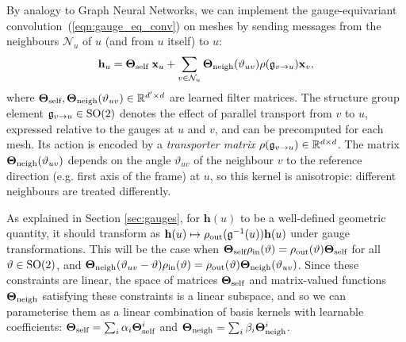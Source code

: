 By analogy to Graph Neural Networks, we can %
implement the gauge-equivariant convolution~(\ref{eqn:gauge_eq_conv}) on meshes by sending messages from the neighbours $\mathcal{N}_u$ of $u$ (and from $u$ itself) to $u$:
\begin{equation}
    \mathbf{h}_u = \boldsymbol{\Theta}_{\textup{self}} \; \mathbf{x}_u + \sum_{v \in \mathcal{N}_u} \boldsymbol{\Theta}_{\textup{neigh}}(\vartheta_{uv}) \rho({\mathfrak{g}}_{v \rightarrow u}) \mathbf{x}_v,
\end{equation}
where $\boldsymbol{\Theta}_{\textup{self}}, \boldsymbol{\Theta}_{\textup{neigh}}(\vartheta_{uv}) \in \mathbb{R}^{d' \times d}$ are learned filter matrices. %
The structure group element ${\mathfrak{g}}_{v \rightarrow u} \in \operatorname{SO}(2)$ denotes the effect of parallel transport from $v$ to $u$, expressed relative to the gauges at $u$ and $v$, and can be precomputed for each mesh. Its action is encoded by a \emph{transporter matrix} $\rho({\mathfrak{g}}_{v\rightarrow u})\in\mathbb{R}^{d\times d}$.
The matrix $\boldsymbol{\Theta}_{\textup{neigh}}(\vartheta_{uv})$ depends on the angle $\vartheta_{uv}$ of the neighbour $v$ to the reference direction (e.g. first axis of the frame) at $u$, so this kernel is anisotropic: different neighbours are treated differently.

As explained in Section \ref{sec:gauges}, 
for $\mathbf{h}(u)$ to be a well-defined geometric quantity, it should transform as $\mathbf{h}(u) \mapsto \rho_{\textup{out}}({\mathfrak{g}}^{-1}(u)) \mathbf{h}(u)$ under gauge transformations.
This will be the case when $\boldsymbol{\Theta}_{\textup{self}} \rho_{\textup{in}}(\vartheta) = \rho_{\textup{out}}(\vartheta) \boldsymbol{\Theta}_{\textup{self}}$ for all $\vartheta \in \operatorname{SO}(2)$, and $\boldsymbol{\Theta}_{\textup{neigh}}(\vartheta_{uv} - \vartheta) \rho_{\textup{in}}(\vartheta) = \rho_{\textup{out}}(\vartheta) \boldsymbol{\Theta}_{\textup{neigh}}(\vartheta_{uv})$.
Since these constraints are linear, the space of matrices $\boldsymbol{\Theta}_{\textup{self}}$ and matrix-valued functions $\boldsymbol{\Theta}_{\textup{neigh}}$ satisfying these constraints is a linear subspace, and so we can parameterise them as a linear combination of basis kernels with learnable coefficients: $\boldsymbol{\Theta}_{\textup{self}} = \sum_i \alpha_i \boldsymbol{\Theta}_{\textup{self}}^i$ and 
$\boldsymbol{\Theta}_{\textup{neigh}} = \sum_i \beta_i \boldsymbol{\Theta}_{\textup{neigh}}^i$.



